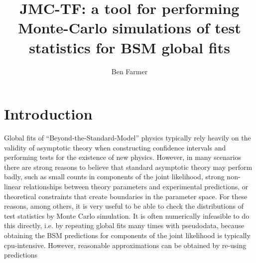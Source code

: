 \documentclass[a4paper]{article}	%
\begin{document}
\title{JMC-TF: a tool for performing Monte-Carlo simulations of test statistics for BSM global fits}

\author{Ben Farmer} 

\date{}

\maketitle



\tableofcontents

\section{Introduction}

Global fits of ``Beyond-the-Standard-Model'' physics typically rely heavily on the validity of asymptotic theory when constructing confidence intervals and performing tests for the existence of new physics. However, in many scenarios there are strong reasons to believe that standard asymptotic theory may perform badly, such as small counts in components of the joint likelihood, strong non-linear relationships between theory parameters and experimental predictions, or theoretical constraints that create boundaries in the parameter space. For these reasons, among others, it is very useful to be able to check the distributions of test statistics by Monte Carlo simulation. It is often numerically infeasible to do this directly, i.e. by repeating global fits many times with pseudodata, because obtaining the BSM predictions for components of the joint likelihood is typically cpu-intensive. However, reasonable approximations can be obtained by re-using predictions

\clearpage

\end{document}
